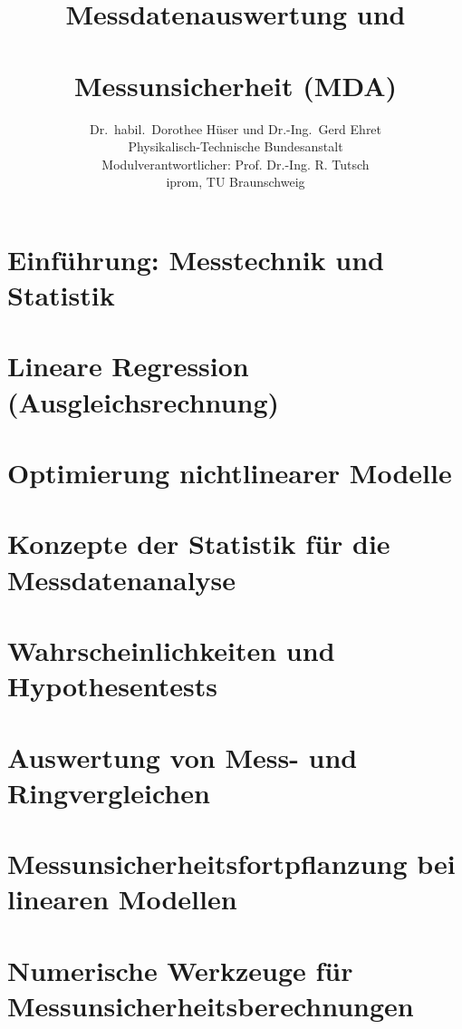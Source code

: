 \documentclass[a4paper,11pt]{book}
\title{\normalfont\sffamily\bfseries{\Huge{Messdatenauswertung und\\~\\ Messunsicherheit (MDA)}}}
\author{Dr.\ habil.\ Dorothee Hüser und Dr.-Ing.\ Gerd Ehret\\
Physikalisch-Technische Bundesanstalt\\
Modulverantwortlicher: Prof. Dr.-Ing. R. Tutsch\\
iprom, TU Braunschweig}
\begin{document}
\frontmatter                            %
\maketitle                              %
\tableofcontents                        %
\mainmatter                             %

\chapter{Einführung: Messtechnik und Statistik}

%
\chapter{Lineare Regression (Ausgleichsrechnung)}
\label{KapitellinReg}

%
\chapter{Optimierung nichtlinearer Modelle}
\label{nonlinOpti}


\chapter{Konzepte der Statistik für die Messdatenanalyse}
\label{konzepteStatistik}

%
\chapter{Wahrscheinlichkeiten und Hypothesentests}
\label{wahrscheinlichHyp}

%
\chapter{Auswertung von Mess- und Ringvergleichen}

%
\chapter{Messunsicherheitsfortpflanzung bei linearen Modellen}
\label{unsicherheitsfortpfLin}

%
\chapter{Numerische Werkzeuge für Messunsicherheitsberechnungen}

%
\end{document}
